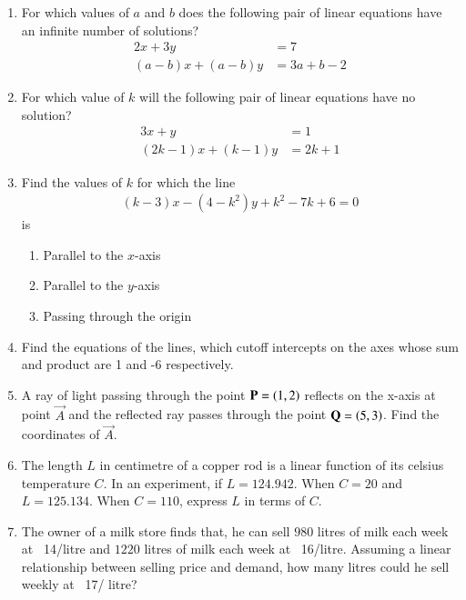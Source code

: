\begin{enumerate}[label=\thesubsection.\arabic*,ref=\thesubsection.\theenumi]
  \item For which values of $a$ and $b$ does the following pair of linear equations have an infinite number of solutions?
	\begin{align}
		2x+3y&=7\\
		(a-b)x+(a-b)y&=3a+b-2
	\end{align}
  \item For which value of $k$ will the following pair of linear equations have no solution?
	\begin{align}
		3x+y&=1\\
		(2k-1)x+(k-1)y&=2k+1
	\end{align}
\item Find the values of $k$ for which the line 
\begin{align}
(k-3)x-(4-k^2)y+k^2-7k+6=0 \label{eq:chapters/11/10/4/1/1}
\end{align}
is
\begin{enumerate}
\item Parallel to the $x$-axis
\item Parallel to the $y$-axis
\item Passing through the origin
\end{enumerate}
    \solution 
		
	\item Find the  equations of the lines, which cutoff intercepts on the axes  whose sum and product are 1 and -6 respectively.
\\
\solution
		
\item A ray of light passing through the point $\mathbf{P} = \left(1, 2\right)$ reflects on the x-axis at point $\vec{A}$ and the reflected ray passes through the point $\mathbf{Q} =\left(5, 3\right)$. Find the coordinates of $\vec{A}$.
\\
    \solution 
		
\item The length $L$ in centimetre of a copper rod is a linear function of its celsius temperature $C$. In an experiment, if $L=124.942$. When $C=20$  and $L=125.134$. When $C=110$, express $L$ in terms of $C$.
\item The owner of a milk store finds that, he can sell $980$ litres of milk each week at \rupee~14/litre and $1220$ litres of milk each week at \rupee~16/litre. Assuming a linear relationship between selling price and demand, how many litres could he sell weekly at \rupee~17/ litre?

\end{enumerate}
